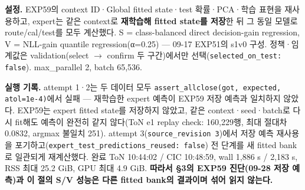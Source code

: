 \textbf{설정.} EXP59의 context ID·Global fitted state·test 확률·PCA·학습 표현을 재사용하고, expert는 같은 context로 \textbf{재학습해 fitted state를 저장}한 뒤 그 동일 모델로 route/\allowbreak{}cal/\allowbreak{}test를 모두 계산했다. S =\allowbreak{} class-balanced direct decision-gain regression, V =\allowbreak{} NLL-gain quantile regression(α=\allowbreak{}0.25) — 09-17 EXP51의 s1v0 구성. 정책·임계값은 validation(select  \ensuremath{\rightarrow}  confirm 두 구간)에서만 선택(\texttt{selected\allowbreak{}\_\allowbreak{}\allowbreak{}on\_\allowbreak{}\allowbreak{}test\allowbreak{}: false}). max\_\allowbreak{}parallel 2, batch 65,536.

\textbf{실행 기록.} attempt 1·2는 두 데이터 모두 \texttt{assert\_\allowbreak{}\allowbreak{}a\allowbreak{}llclose(\allowbreak{}got,\allowbreak{} exp\allowbreak{}ected,\allowbreak{} a\allowbreak{}tol=\allowbreak{}\allowbreak{}1e-\allowbreak{}4\allowbreak{})}에서 실패 — 재학습한 expert 예측이 EXP59 저장 예측과 일치하지 않았다. EXP59는 expert fitted state를 저장하지 않았고, 같은 context·seed·batch로 다시 fit해도 예측이 완전히 같지 않다(ToN e1 replay check: 160,229행, 최대 절대차 0.0832, argmax 불일치 251). attempt 3(\texttt{source\_\allowbreak{}\allowbreak{}r\allowbreak{}evision \allowbreak{}3})에서 저장 예측 재사용을 포기하고(\texttt{expert\_\allowbreak{}\allowbreak{}t\allowbreak{}est\_\allowbreak{}\allowbreak{}pred\allowbreak{}ictions\_\allowbreak{}\allowbreak{}reused: \allowbreak{}false}) 전 단계를 새 fitted bank로 일관되게 재계산했다. 완료 ToN 10:44:02 /\allowbreak{} CIC 10:48:59, wall 1,886 s /\allowbreak{} 2,183 s, RSS 최대 25.2 GiB, GPU 최대 4.9 GiB. \textbf{따라서 §3의 EXP59 진단(09-28 저장 예측)과 이 절의 S/\allowbreak{}V 성능은 다른 fitted bank의 결과이며 섞어 읽지 않는다.}

